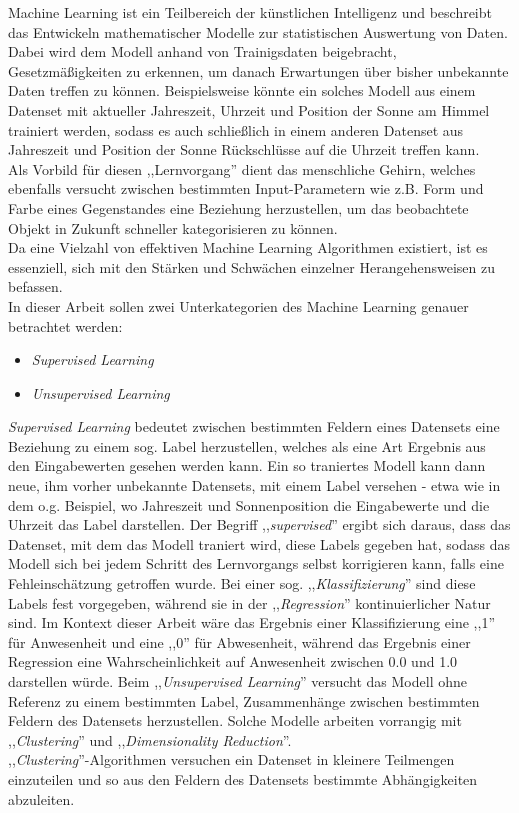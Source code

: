 Machine Learning ist ein Teilbereich der künstlichen Intelligenz und beschreibt das Entwickeln mathematischer 
Modelle zur statistischen Auswertung von Daten.\\
Dabei wird dem Modell anhand von Trainigsdaten beigebracht, Gesetzmäßigkeiten zu erkennen, um danach Erwartungen 
über bisher unbekannte Daten treffen zu können.  
Beispielsweise könnte ein solches Modell aus einem Datenset mit aktueller Jahreszeit, Uhrzeit und 
Position der Sonne am Himmel trainiert werden, sodass es auch schließlich in einem anderen Datenset 
aus Jahreszeit und Position der Sonne Rückschlüsse auf die Uhrzeit treffen kann.\\
Als Vorbild für diesen ,,Lernvorgang'' dient das menschliche Gehirn, welches ebenfalls versucht zwischen 
bestimmten Input-Parametern wie z.B. Form und Farbe eines Gegenstandes eine Beziehung herzustellen,
um das beobachtete Objekt in Zukunft schneller kategorisieren zu können.\\
Da eine Vielzahl von effektiven Machine Learning Algorithmen existiert, ist es essenziell, sich mit den
Stärken und Schwächen einzelner Herangehensweisen zu befassen.\\

In dieser Arbeit sollen zwei Unterkategorien des Machine Learning genauer betrachtet werden:
\begin{itemize}
    \item \textit{Supervised Learning} 
    \item \textit{Unsupervised Learning}
\end{itemize}
\textit{Supervised Learning} bedeutet zwischen bestimmten Feldern eines Datensets eine Beziehung
zu einem sog. Label herzustellen, welches als eine Art Ergebnis aus den Eingabewerten gesehen 
werden kann. Ein so traniertes Modell kann dann neue, ihm vorher unbekannte Datensets, mit einem 
Label versehen - etwa wie in dem o.g. Beispiel, wo Jahreszeit und Sonnenposition die Eingabewerte 
und die Uhrzeit das Label darstellen. Der Begriff ,,\textit{supervised}'' ergibt sich daraus, dass 
das Datenset, mit dem das Modell traniert wird, diese Labels gegeben 
hat, sodass das Modell sich bei jedem Schritt des Lernvorgangs selbst korrigieren kann, falls 
eine Fehleinschätzung getroffen wurde.
Bei einer sog. ,,\textit{Klassifizierung}'' sind diese Labels fest vorgegeben, während sie in der 
,,\textit{Regression}'' kontinuierlicher Natur sind. Im Kontext dieser Arbeit wäre das Ergebnis einer 
Klassifizierung eine ,,1'' für Anwesenheit und eine ,,0'' für Abwesenheit, während das Ergebnis einer 
Regression eine Wahrscheinlichkeit auf Anwesenheit zwischen 0.0 und 1.0 darstellen würde.
\newpage
Beim ,,\textit{Unsupervised Learning}'' versucht das Modell ohne Referenz zu einem bestimmten 
Label, Zusammenhänge zwischen bestimmten Feldern des Datensets herzustellen. Solche Modelle 
arbeiten vorrangig mit ,,\textit{Clustering}'' und ,,\textit{Dimensionality Reduction}''.\\
,,\textit{Clustering}''-Algorithmen versuchen ein Datenset in kleinere Teilmengen einzuteilen und
so aus den Feldern des Datensets bestimmte Abhängigkeiten abzuleiten.

